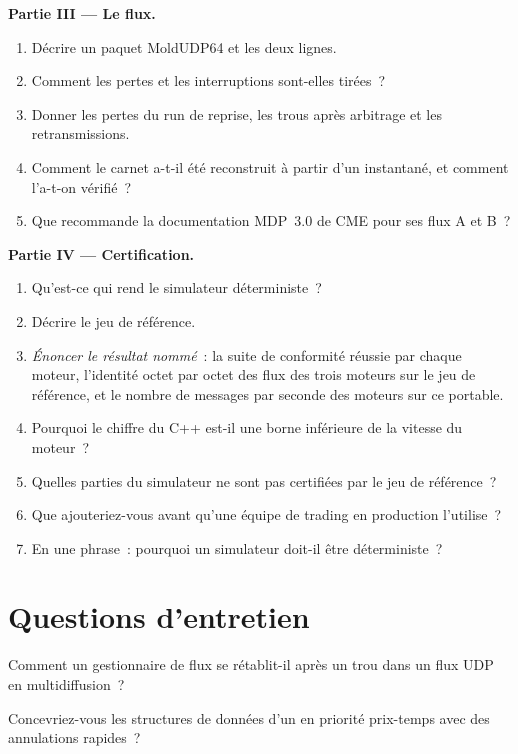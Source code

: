 \begin{problem}
\medskip\noindent\textbf{Partie III --- Le flux.}
\begin{enumerate}[resume]
\item Décrire un paquet MoldUDP64 et les deux lignes.
\item Comment les pertes et les interruptions sont-elles tirées~?
\item Donner les pertes du run de reprise, les trous après arbitrage et les retransmissions.
\item Comment le carnet a-t-il été reconstruit à partir d'un instantané, et comment l'a-t-on vérifié~?
\item Que recommande la documentation MDP~3.0 de CME pour ses flux A et B~?
\end{enumerate}

\medskip\noindent\textbf{Partie IV --- Certification.}
\begin{enumerate}[resume]
\item Qu'est-ce qui rend le simulateur déterministe~?
\item Décrire le jeu de référence.
\item \emph{Énoncer le résultat nommé}~: la suite de conformité réussie par chaque moteur, l'identité octet par octet des flux des trois moteurs sur le jeu de référence, et le
nombre de messages par seconde des moteurs sur ce portable.
\item Pourquoi le chiffre du C++ est-il une borne inférieure de la vitesse du moteur~?
\item Quelles parties du simulateur ne sont pas certifiées par le jeu de référence~?
\item Que ajouteriez-vous avant qu'une équipe de trading en production l'utilise~?
\item En une phrase~: pourquoi un simulateur doit-il être déterministe~?
\end{enumerate}
\end{problem}

\section{Questions d'entretien}

\begin{interviewq}\label{iq:mx:build-a-matching-engine-and-exchange-simulator:1}
Comment un gestionnaire de flux se rétablit-il après un trou dans un flux UDP en multidiffusion~?
\end{interviewq}

\begin{interviewq}\label{iq:mx:build-a-matching-engine-and-exchange-simulator:2}
Concevriez-vous les structures de données d'un  en priorité prix-temps avec des annulations rapides~?
\end{interviewq}

